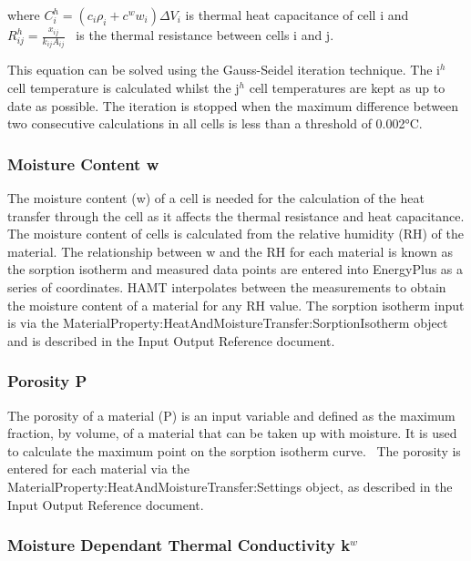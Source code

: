 where \(C_i^h = \left( {{c_i}{\rho_i} + {c^w}{w_i}} \right)\Delta {V_i}\) is thermal heat capacitance of cell i and \(R_{ij}^h = \frac{x_{ij}}{k_{ij}A_{ij}}\) ~is the thermal resistance between cells i and j.

This equation can be solved using the Gauss-Seidel iteration technique. The i\(^{h}\) cell temperature is calculated whilst the j\(^{h}\) cell temperatures are kept as up to date as possible. The iteration is stopped when the maximum difference between two consecutive calculations in all cells is less than a threshold of 0.002°C.

\subsubsection{Moisture Content w}\label{moisture-content-w}

The moisture content (w) of a cell is needed for the calculation of the heat transfer through the cell as it affects the thermal resistance and heat capacitance. The moisture content of cells is calculated from the relative humidity (RH) of the material. The relationship between w and the RH for each material is known as the sorption isotherm and measured data points are entered into EnergyPlus as a series of coordinates. HAMT interpolates between the measurements to obtain the moisture content of a material for any RH value. The sorption isotherm input is via the MaterialProperty:HeatAndMoistureTransfer:SorptionIsotherm object and is described in the Input Output Reference document.

\subsubsection{Porosity P}\label{porosity-p}

The porosity of a material (P) is an input variable and defined as the maximum fraction, by volume, of a material that can be taken up with moisture. It is used to calculate the maximum point on the sorption isotherm curve. ~The porosity is entered for each material via the MaterialProperty:HeatAndMoistureTransfer:Settings object, as described in the Input Output Reference document.

\subsubsection{\texorpdfstring{Moisture Dependant Thermal Conductivity k\(^{w}\)}{Moisture Dependant Thermal Conductivity k\^{}\{w\}}}\label{moisture-dependant-thermal-conductivity-kw}

